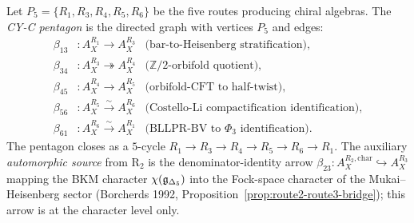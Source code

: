 \begin{definition}
\label{def:cy-c-pentagon}
Let $P_5 = \{R_1, R_3, R_4, R_5, R_6\}$ be the five routes producing chiral algebras. The \emph{CY-C pentagon}
is the directed graph with vertices $P_5$ and edges:
\begin{align*}
 \beta_{13} &: A_X^{R_1} \longrightarrow A_X^{R_3} &\text{(bar-to-Heisenberg stratification)},\\
 \beta_{34} &: A_X^{R_3} \twoheadrightarrow A_X^{R_4} &\text{($\mathbb{Z}/2$-orbifold quotient)},\\
 \beta_{45} &: A_X^{R_4} \longrightarrow A_X^{R_5} &\text{(orbifold-CFT to half-twist)},\\
 \beta_{56} &: A_X^{R_5} \xrightarrow{\sim} A_X^{R_6} &\text{(Costello-Li compactification identification)},\\
 \beta_{61} &: A_X^{R_6} \xrightarrow{\sim} A_X^{R_1} &\text{(BLLPR-BV to $\Phi_3$ identification)}.
\end{align*}
The pentagon closes as a $5$-cycle $R_1 \to R_3 \to R_4 \to R_5 \to R_6 \to R_1$. The auxiliary
\emph{automorphic source} from R$_2$ is the denominator-identity arrow
$\beta_{23}: A_X^{R_2, \mathrm{char}} \hookrightarrow A_X^{R_3}$
mapping the BKM character $\chi(\mathfrak{g}_{\Delta_5})$ into the Fock-space character of the Mukai--Heisenberg sector (Borcherds 1992,
Proposition~\ref{prop:route2-route3-bridge}); this arrow is at the character level only.
\end{definition}

